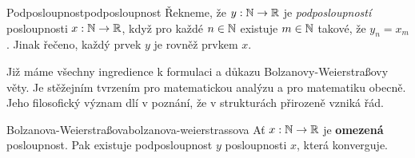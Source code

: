 \begin{definition}{Podposloupnost}{podposloupnost}
 Řekneme, že $y:\mathbb{N} \to \mathbb{R}$ je \emph{podposloupností} posloupnosti $x:\mathbb{N} \to \mathbb{R}$,
 když pro každé $n \in \mathbb{N}$ existuje $m \in \mathbb{N}$ takové, že $y_n = x_m$. Jinak
 řečeno, každý prvek $y$ je rovněž prvkem $x$.
\end{definition}

Již máme všechny ingredience k formulaci a důkazu Bolzanovy-Weierstraßovy věty.
Je stěžejním tvrzením pro matematickou analýzu a pro matematiku obecně. Jeho
filosofický význam dlí v poznání, že v  strukturách přirozeně
vzniká řád.

\begin{theorem}{Bolzanova-Weierstraßova}{bolzanova-weierstrassova}
 Ať $x:\mathbb{N} \to \mathbb{R}$ je \textbf{omezená} posloupnost. Pak existuje podposloupnost
 $y$ posloupnosti $x$, která konverguje.
\end{theorem}

